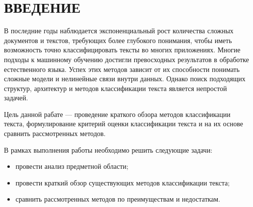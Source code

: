 \section*{ВВЕДЕНИЕ}

В последние годы наблюдается экспоненциальный рост количества сложных документов и текстов, требующих более глубокого понимания, чтобы иметь возможность точно классифицировать тексты во многих приложениях. Многие подходы к машинному обучению достигли превосходных результатов в обработке естественного языка. Успех этих методов зависит от их способности понимать сложные модели и нелинейные связи внутри данных. Однако поиск подходящих структур, архитектур и методов классификации текста является непростой задачей. 

Цель данной рабате --- проведение краткого обзора методов классификации текста, формулирование критерий оценки классификации текста и на их основе сравнить рассмотренных методов.

В рамках выполнения работы необходимо решить следующие задачи:

\begin{itemize}[label = ---]
    \item провести анализ предметной области;
    \item провести краткий обзор существующих методов классификации текста;
    \item сравнить рассмотренных методов по преимуществам и недостаткам.
\end{itemize}